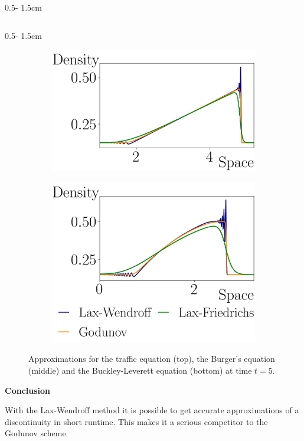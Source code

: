 \documentclass{uibposter}
\begin{document}
\begin{frame}[fragile]
\begin{columns}
\begin{column}{0.5\textwidth - 1.5cm}
\begin{column}{0.5\textwidth - 1.5cm}
\begin{figure}
	\begin{subfigure}{\textwidth}
		\includegraphics{fig/burger_compare.png}
	\end{subfigure}

	\begin{subfigure}{\textwidth}
		\includegraphics{fig/buckley_compare.png}
	\end{subfigure}
	\caption{Approximations for the traffic equation (top), the Burger's equation (middle) and the Buckley-Leverett equation (bottom) at time $t = 5$.}
	\label{img:non_lin_equation}
\end{figure}

\textbf{Conclusion}

\vspace{0.5cm}
With the Lax-Wendroff method it is possible to get accurate approximations of a discontinuity in short runtime. 
This makes it a serious competitor to the Godunov scheme.


\end{column}
\end{column}
\end{columns}
\end{frame}
\end{document}
